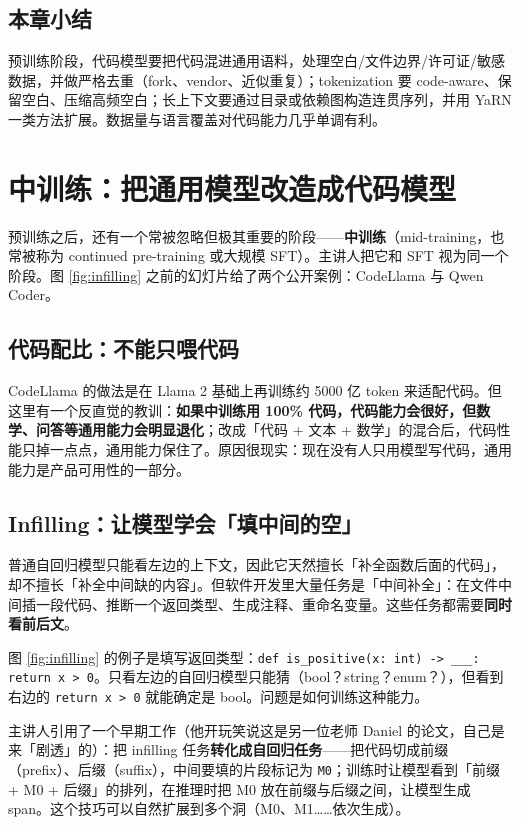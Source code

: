 ﻿\documentclass[a4paper]{article}
\begin{document}
\subsection{本章小结}
预训练阶段，代码模型要把代码混进通用语料，处理空白/文件边界/许可证/敏感数据，并做严格去重（fork、vendor、近似重复）；tokenization 要 code-aware、保留空白、压缩高频空白；长上下文要通过目录或依赖图构造连贯序列，并用 YaRN 一类方法扩展。数据量与语言覆盖对代码能力几乎单调有利。

\section{中训练：把通用模型改造成代码模型}

预训练之后，还有一个常被忽略但极其重要的阶段——\textbf{中训练}（mid-training，也常被称为 continued pre-training 或大规模 SFT）。主讲人把它和 SFT 视为同一个阶段。图 \ref{fig:infilling} 之前的幻灯片给了两个公开案例：CodeLlama 与 Qwen Coder。

\subsection{代码配比：不能只喂代码}

CodeLlama 的做法是在 Llama 2 基础上再训练约 5000 亿 token 来适配代码。但这里有一个反直觉的教训：\textbf{如果中训练用 100\% 代码，代码能力会很好，但数学、问答等通用能力会明显退化}；改成「代码 + 文本 + 数学」的混合后，代码性能只掉一点点，通用能力保住了。原因很现实：现在没有人只用模型写代码，通用能力是产品可用性的一部分。

\subsection{Infilling：让模型学会「填中间的空」}

普通自回归模型只能看左边的上下文，因此它天然擅长「补全函数后面的代码」，却不擅长「补全中间缺的内容」。但软件开发里大量任务是「中间补全」：在文件中间插一段代码、推断一个返回类型、生成注释、重命名变量。这些任务都需要\textbf{同时看前后文}。

图 \ref{fig:infilling} 的例子是填写返回类型：\texttt{def is\_positive(x: int) -> \_\_\_: return x > 0}。只看左边的自回归模型只能猜（bool？string？enum？），但看到右边的 \texttt{return x > 0} 就能确定是 bool。问题是如何训练这种能力。

主讲人引用了一个早期工作（他开玩笑说这是另一位老师 Daniel 的论文，自己是来「剧透」的）：把 infilling 任务\textbf{转化成自回归任务}——把代码切成前缀（prefix）、后缀（suffix），中间要填的片段标记为 \texttt{M0}；训练时让模型看到「前缀 + M0 + 后缀」的排列，在推理时把 M0 放在前缀与后缀之间，让模型生成 span。这个技巧可以自然扩展到多个洞（M0、M1……依次生成）。
\end{document}

